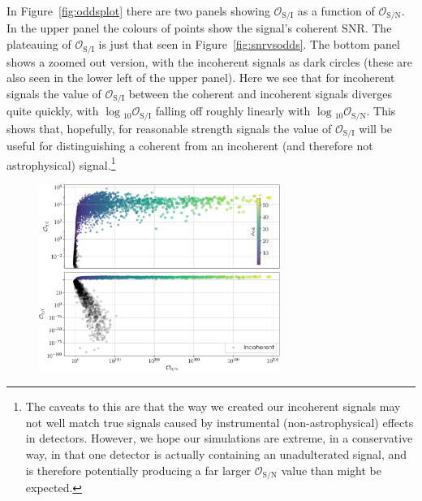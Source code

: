 In Figure~\ref{fig:oddsplot} there are two panels showing $\mathcal{O}_{\text{S}/\text{I}}$ as a function of $\mathcal{O}_{\text{S}/\text{N}}$. In the upper
panel the colours of points show the signal's coherent SNR. The plateauing of $\mathcal{O}_{\text{S}/\text{I}}$ is just that seen in Figure~\ref{fig:snrvsodds}. The
bottom panel shows a zoomed out version, with the incoherent signals as dark circles (these are also seen in the lower left of the upper panel). Here we see that for incoherent signals
the value of $\mathcal{O}_{\text{S}/\text{I}}$ between the coherent and incoherent signals diverges quite quickly, with $\log{}_{10}{\mathcal{O}_{\text{S}/\text{I}}}$
falling off roughly linearly with $\log{}_{10}{\mathcal{O}_{\text{S}/\text{N}}}$. This shows that, hopefully, for reasonable strength signals the value of
$\mathcal{O}_{\text{S}/\text{I}}$ will be useful for distinguishing a coherent from an incoherent (and therefore not astrophysical) signal.\footnote{The caveats
to this are that the way we created our incoherent signals may not well match true signals caused by instrumental (non-astrophysical) effects in \gw detectors.
However, we hope our simulations are extreme, in a conservative way, in that one detector is actually containing an unadulterated signal, and is therefore
potentially producing a far larger $\mathcal{O}_{\text{S}/\text{N}}$ value than might be expected.}

\begin{figure}[phtb]
\begin{center}
\includegraphics[width=0.7\textwidth]{./figures/codeeval/stats/odds/odds_plot}
\caption{ \protect}
\end{center}
\end{figure}

